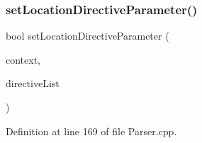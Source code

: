 \subsubsection{\texorpdfstring{set\+Location\+Directive\+Parameter()}{setLocationDirectiveParameter()}}
{\footnotesize\ttfamily bool set\+Location\+Directive\+Parameter (\begin{DoxyParamCaption}\item[{\hyperlink{classft_1_1_location_block}{Location\+Block} \&}]{context,  }\item[{std\+::vector$<$ \hyperlink{classft_1_1_directive}{Directive} $>$}]{directive\+List }\end{DoxyParamCaption})\hspace{0.3cm}{\ttfamily [private]}}



Definition at line 169 of file Parser.\+cpp.


